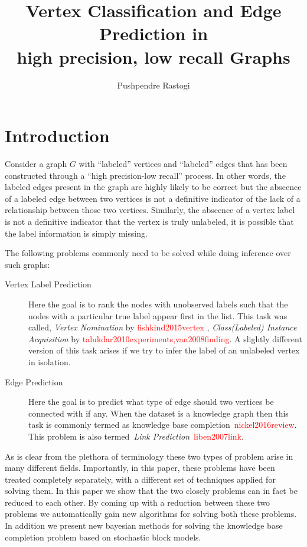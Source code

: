 \documentclass{tufte-handout}
\title{Vertex Classification and Edge Prediction in\\high precision, low recall Graphs}
\author{Pushpendre Rastogi}
\newcommand{\note}[1]{\todo[author=Pushpendre,color=blue!40,size=\small,fancyline,inline]{#1}}
\renewcommand{\cite}[1]{\textcolor{red}{#1}}
\begin{document}
\maketitle
\section{Introduction}
\label{sec:introduction}
Consider a graph $G$ with ``labeled'' vertices and ``labeled'' edges
that has been constructed through a ``high precision-low recall'' process. 
In other words,
the labeled edges present in the graph are highly likely to be correct
but the abscence of a labeled edge between two vertices is not a definitive 
indicator of the lack of a relationship between those two vertices. 
Similarly, the abscence of a vertex label is not a definitive indicator
that the vertex is truly unlabeled, it is possible that the label information
is simply missing.

The following problems commonly need to be solved while doing
inference over such graphs:
\begin{description}
\item[Vertex Label Prediction] Here the goal is to rank the nodes with unobserved 
  labels such that the nodes with a particular true label appear first in the 
  list. This task was called, \textit{Vertex Nomination} by \cite{fishkind2015vertex}
  \note{Give example.}, \textit{Class(Labeled) Instance Acquisition} by 
  \cite{talukdar2010experiments,van2008finding}. 
  A slightly different version of 
  this task arises if we try to infer the label of 
  an unlabeled vertex in isolation. 
\item[Edge Prediction] Here the goal is to predict what type of edge should two
  vertices be connected with if any. When the dataset is a knowledge graph
  then this task is commonly termed as knowledge base 
  completion~\cite{nickel2016review}. This problem is also 
  termed~\textit{Link Prediction}~\cite{liben2007link}.
\end{description}
As is clear from the plethora of terminology these two types of problem arise in
many different fields. Importantly, in this paper, these problems have been
treated completely separately, with a different set of techniques applied for
solving them. In this paper we show that the two closely problems can in fact be
reduced to each other. By coming up with a reduction between these two problems
we automatically gain new algorithms for solving both these problems. 
In addition we present new bayesian methods for solving the knowledge base
completion problem based on stochastic block models. 
\end{document}
